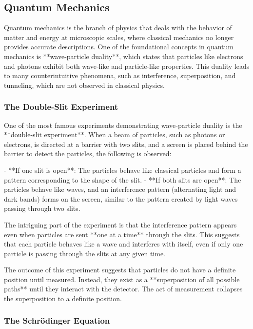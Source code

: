 \documentclass{article}
\begin{document}
\subsection{Quantum Mechanics}

Quantum mechanics is the branch of physics that deals with the behavior of matter and energy at microscopic scales, where classical mechanics no longer provides accurate descriptions. One of the foundational concepts in quantum mechanics is **wave-particle duality**, which states that particles like electrons and photons exhibit both wave-like and particle-like properties. This duality leads to many counterintuitive phenomena, such as interference, superposition, and tunneling, which are not observed in classical physics.

\subsubsection*{The Double-Slit Experiment}

One of the most famous experiments demonstrating wave-particle duality is the **double-slit experiment**. When a beam of particles, such as photons or electrons, is directed at a barrier with two slits, and a screen is placed behind the barrier to detect the particles, the following is observed:

- **If one slit is open**: The particles behave like classical particles and form a pattern corresponding to the shape of the slit.
- **If both slits are open**: The particles behave like waves, and an interference pattern (alternating light and dark bands) forms on the screen, similar to the pattern created by light waves passing through two slits.

The intriguing part of the experiment is that the interference pattern appears even when particles are sent **one at a time** through the slits. This suggests that each particle behaves like a wave and interferes with itself, even if only one particle is passing through the slits at any given time.

The outcome of this experiment suggests that particles do not have a definite position until measured. Instead, they exist as a **superposition of all possible paths** until they interact with the detector. The act of measurement collapses the superposition to a definite position.

\subsubsection*{The Schrödinger Equation}
\end{document}
